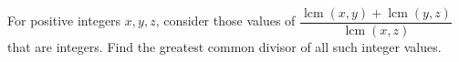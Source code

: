 For positive integers $ x,y,z $, consider those values of $\dfrac{\operatorname{lcm}(x,y)+\operatorname{lcm}(y,z)}{\operatorname{lcm}(x,z)}$ that are integers. Find the greatest common divisor of all such integer values.
